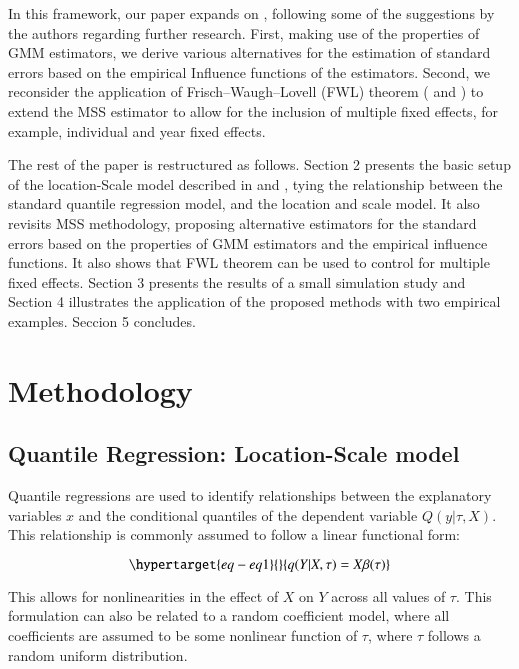 \documentclass[
  authoryear,
  review,
  1p]{elsarticle}
\begin{document}
In this framework, our paper expands on \citet{mss2019}, following some
of the suggestions by the authors regarding further research. First,
making use of the properties of GMM estimators, we derive various
alternatives for the estimation of standard errors based on the
empirical Influence functions of the estimators. Second, we reconsider
the application of Frisch--Waugh--Lovell (FWL) theorem
(\citet{frishwaugh1933} and \citet{lovell1963}) to extend the MSS
estimator to allow for the inclusion of multiple fixed effects, for
example, individual and year fixed effects.

The rest of the paper is restructured as follows. Section 2 presents the
basic setup of the location-Scale model described in \citet{he1997} and
\citet{zhao2000}, tying the relationship between the standard quantile
regression model, and the location and scale model. It also revisits MSS
methodology, proposing alternative estimators for the standard errors
based on the properties of GMM estimators and the empirical influence
functions. It also shows that FWL theorem can be used to control for
multiple fixed effects. Section 3 presents the results of a small
simulation study and Section 4 illustrates the application of the
proposed methods with two empirical examples. Seccion 5 concludes.

\hypertarget{sec-method}{%
\section{Methodology}\label{sec-method}}

\hypertarget{sec-betas}{%
\subsection{Quantile Regression: Location-Scale model}\label{sec-betas}}

Quantile regressions are used to identify relationships between the
explanatory variables \(x\) and the conditional quantiles of the
dependent variable \(Q(y|\tau,X)\). This relationship is commonly
assumed to follow a linear functional form:

\begin{equation}\protect\hypertarget{eq-eq1}{}{q(Y|X,\tau) =X\beta(\tau)
}\label{eq-eq1}\end{equation}

This allows for nonlinearities in the effect of \(X\) on \(Y\) across
all values of \(\tau\). This formulation can also be related to a random
coefficient model, where all coefficients are assumed to be some
nonlinear function of \(\tau\), where \(\tau\) follows a random uniform
distribution.
\end{document}
